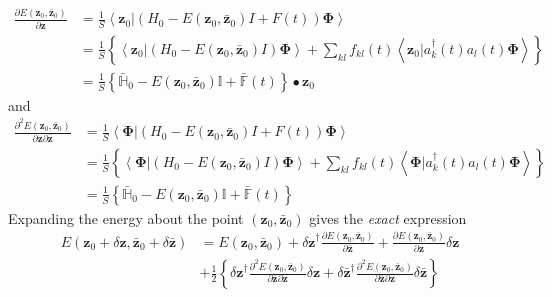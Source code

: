 \documentclass[aps,preprint]{revtex4}%
\begin{document}
\begin{align}
\frac{\partial E\left(  \mathbf{z}{_{0},\mathbf{\bar{z}}_{0}}\right)
}{\partial\mathbf{z}}  &  =\frac{1}{S}\left\langle \left.  \mathbf{z}{_{0}%
}\right\vert \left(  H_{0}-E\left(  \mathbf{z}{_{0},\mathbf{\bar{z}}_{0}%
}\right)  I+F\left(  t\right)  \right)  \mathbf{\Phi}\right\rangle \nonumber\\
&  =\frac{1}{S}\left\{  \left\langle \left.  \mathbf{z}{_{0}}\right\vert
\left(  H_{0}-E\left(  \mathbf{z}{_{0},\mathbf{\bar{z}}_{0}}\right)  I\right)
\mathbf{\Phi}\right\rangle +\sum_{kl}f_{kl}{{\left(  t\right)  }}\left\langle
\left.  \mathbf{z}{_{0}}\right\vert a_{k}^{\dag}\left(  t\right)  a_{l}\left(
t\right)  \mathbf{\Phi}\right\rangle \right\} \nonumber\\
&  =\frac{1}{S}\left\{  \mathbb{\bar{H}}_{0}-E\left(  \mathbf{z}%
{_{0},\mathbf{\bar{z}}_{0}}\right)  \mathbb{I}+\mathbb{\bar{F}}\left(
t\right)  \right\}  \bullet\mathbf{z}{_{0}}%
\end{align}
and
\begin{align}
\frac{\partial^{2}E\left(  \mathbf{z}{_{0},\mathbf{\bar{z}}_{0}}\right)
}{\partial\mathbf{z}\partial\mathbf{\bar{z}}}  &  =\frac{1}{S}\left\langle
\left.  \mathbf{\Phi}\right\vert \left(  H_{0}-E\left(  \mathbf{z}%
{_{0},\mathbf{\bar{z}}_{0}}\right)  I+F\left(  t\right)  \right)
\mathbf{\Phi}\right\rangle \nonumber\\
&  =\frac{1}{S}\left\{  \left\langle \left.  \mathbf{\Phi}\right\vert \left(
H_{0}-E\left(  \mathbf{z}{_{0},\mathbf{\bar{z}}_{0}}\right)  I\right)
\mathbf{\Phi}\right\rangle +\sum_{kl}f_{kl}{{\left(  t\right)  }}\left\langle
\left.  \mathbf{\Phi}\right\vert a_{k}^{\dag}\left(  t\right)  a_{l}\left(
t\right)  \mathbf{\Phi}\right\rangle \right\} \nonumber\\
&  =\frac{1}{S}\left\{  \mathbb{\bar{H}}_{0}-E\left(  \mathbf{z}%
{_{0},\mathbf{\bar{z}}_{0}}\right)  \mathbb{I}+\mathbb{\bar{F}}\left(
t\right)  \right\}
\end{align}
Expanding the energy about the point $\left(  \mathbf{z}{_{0},\mathbf{\bar{z}%
}_{0}}\right)  $ gives the \emph{exact} expression
\begin{align}
E\left(  \mathbf{z}{_{0}+\delta\mathbf{z},\mathbf{\bar{z}}_{0}+\delta
\mathbf{\bar{z}}}\right)   &  =E\left(  \mathbf{z}{_{0},\mathbf{\bar{z}}_{0}%
}\right)  +{\delta\mathbf{z}}^{\dagger}\frac{\partial E\left(  \mathbf{z}%
{_{0},\mathbf{\bar{z}}_{0}}\right)  }{\partial{\mathbf{\bar{z}}}}%
+\frac{\partial E\left(  \mathbf{z}{_{0},\mathbf{\bar{z}}_{0}}\right)
}{\partial{\mathbf{z}}}{\delta\mathbf{z}}\nonumber\\
&  +\frac{1}{2}\left\{  {\delta\mathbf{z}}^{\dagger}\frac{\partial^{2}E\left(
\mathbf{z}{_{0},\mathbf{\bar{z}}_{0}}\right)  }{\partial{\mathbf{\bar{z}}%
}\partial{\mathbf{z}}}{\delta\mathbf{z+}\delta\mathbf{\bar{z}}}^{\dagger}%
\frac{\partial^{2}E\left(  \mathbf{z}{_{0},\mathbf{\bar{z}}_{0}}\right)
}{\partial{\mathbf{\bar{z}}}\partial{\mathbf{z}}}{\delta\mathbf{\bar{z}}%
}\right\}
\end{align}
\end{document}
